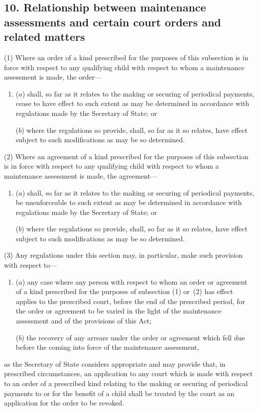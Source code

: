 \documentclass[12pt,a4paper]{article}
\begin{document}
\subsection{10. Relationship between maintenance assessments and certain court orders and related matters}

(1) Where an order of a kind prescribed for the purposes of this subsection is in force with respect to any qualifying child with respect to whom a maintenance assessment is made, the order—
\begin{enumerate}\item[]
($a$) shall, so far as it relates to the making or securing of periodical payments, cease to have effect to such extent as may be determined in accordance with regulations made by the Secretary of State; or

($b$) where the regulations so provide, shall, so far as it so relates, have effect subject to such modifications as may be so determined.
\end{enumerate}

(2) Where an agreement of a kind prescribed for the purposes of this subsection is in force with respect to any qualifying child with respect to whom a maintenance assessment is made, the agreement—
\begin{enumerate}\item[]
($a$) shall, so far as it relates to the making or securing of periodical payments, be unenforceable to such extent as may be determined in accordance with regulations made by the Secretary of State; or

($b$) where the regulations so provide, shall, so far as it so relates, have effect subject to such modifications as may be so determined.
\end{enumerate}

(3) Any regulations under this section may, in particular, make such provision with respect to—
\begin{enumerate}\item[]
($a$) any case where any person with respect to whom an order or agreement of a kind prescribed for the purposes of subsection (1)  or~(2)  has effect applies to the prescribed court, before the end of the prescribed period, for the order or agreement to be varied in the light of the maintenance assessment and of the provisions of this Act;

($b$) the recovery of any arrears under the order or agreement which fell due before the coming into force of the maintenance assessment,
\end{enumerate}
as the Secretary of State considers appropriate and may provide that, in prescribed circumstances, an application to any court which is made with respect to an order of a prescribed kind relating to the making or securing of periodical payments to or for the benefit of a child shall be treated by the court as an application for the order to be revoked.
\end{document}
